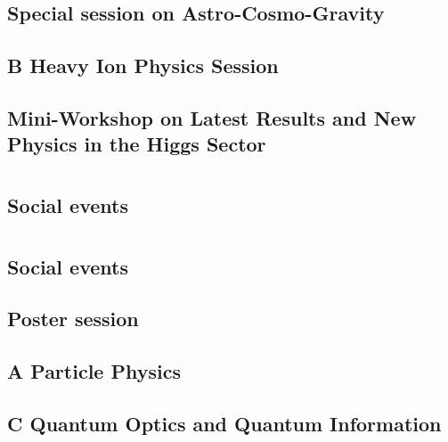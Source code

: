 \subsection{Special session on Astro-Cosmo-Gravity}

\clearpage

\subsection{B Heavy Ion Physics Session}

\clearpage

\subsection{Mini-Workshop on Latest Results and New Physics in the Higgs Sector}

\clearpage

\section{}
\subsection{Social events}

\clearpage

\section{}
\subsection{Social events}

\clearpage

\subsection{Poster session}

\clearpage

\subsection{A Particle Physics}

\clearpage

\subsection{C Quantum Optics and Quantum Information}

\clearpage

